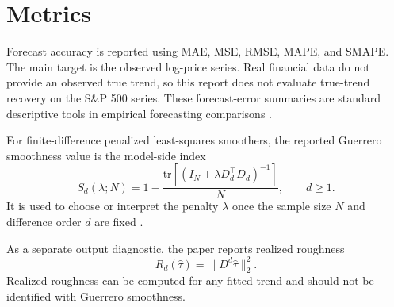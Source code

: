 \section{Metrics}
Forecast accuracy is reported using MAE, MSE, RMSE, MAPE, and SMAPE. The main
target is the observed log-price series. Real financial data do not provide an
observed true trend, so this report does not evaluate true-trend recovery on the
S\&P 500 series. These forecast-error summaries are standard descriptive tools
in empirical forecasting comparisons \citep{makridakis1998forecasting,
hyndman2008exponential}.

For finite-difference penalized least-squares smoothers, the reported
Guerrero smoothness value is the model-side index
\[
  S_d(\lambda; N)
  =
  1 -
  \frac{\mathrm{tr}\left[\left(I_N+\lambda D_d^\top D_d\right)^{-1}\right]}{N},
  \qquad d \ge 1.
\]
It is used to choose or interpret the penalty \(\lambda\) once the sample size
\(N\) and difference order \(d\) are fixed \citep{guerrero2007penalized}.

As a separate output diagnostic, the paper reports realized roughness
\[
  R_d(\hat{\tau}) = \|D^d\hat{\tau}\|_2^2.
\]
Realized roughness can be computed for any fitted trend and should not be
identified with Guerrero smoothness.
